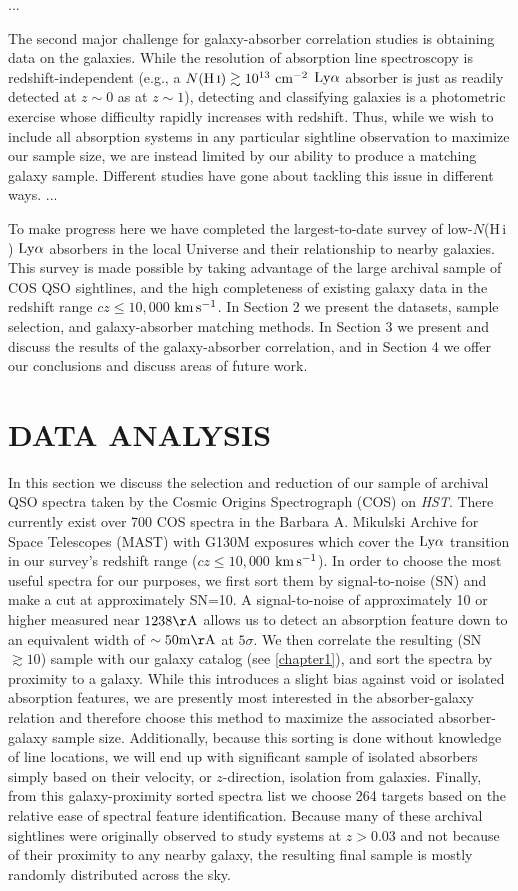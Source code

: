 \documentclass[twocolumn,tighten]{aastex62}
\newcommand{\kms}{$\rm km\, s^{-1}$}
\newcommand{\HI}{\mbox{H\,{\sc i}} }
\begin{document}
...


The second major challenge for galaxy-absorber correlation studies is obtaining data on the galaxies. While the resolution of absorption line spectroscopy is redshift-independent (e.g., a $N(\HI) \gtrsim 10^{13}  ~\rm cm^{-2}$ $\rm Ly\alpha$ absorber is just as readily detected at $z\sim0$ as at $z\sim 1$), detecting and classifying galaxies is a photometric exercise whose difficulty rapidly increases with redshift. Thus, while we wish to include all absorption systems in any particular sightline observation to maximize our sample size, we are instead limited by our ability to produce a matching galaxy sample. Different studies have gone about tackling this issue in different ways. ...


To make progress here we have completed the largest-to-date survey of low-$N$(\HI) $\rm Ly\alpha$ absorbers in the local Universe and their relationship to nearby galaxies. This survey is made possible by taking advantage of the large archival sample of COS QSO sightlines, and the high completeness of existing galaxy data in the redshift range $cz \leq 10,000$ \kms. In Section 2 we present the datasets, sample selection, and galaxy-absorber matching methods. In Section 3 we present and discuss the results of the galaxy-absorber correlation, and in Section 4 we offer our conclusions and discuss areas of future work.



\section{DATA ANALYSIS}
In this section we discuss the selection and reduction of our sample of archival QSO spectra taken by the Cosmic Origins Spectrograph (COS) on \textit{HST}. There currently exist over 700 COS spectra in the Barbara A. Mikulski Archive for Space Telescopes (MAST) with G130M exposures which cover the $\rm Ly\alpha$ transition in our survey's redshift range ($cz \leq 10,000$ \kms). In order to choose the most useful spectra for our purposes, we first sort them by signal-to-noise (SN) and make a cut at approximately SN=10. A signal-to-noise of approximately 10 or higher measured near $\rm 1238 \AA$ allows us to detect an absorption feature down to an equivalent width of $\rm \sim 50 m\AA$ at $5\sigma$. We then correlate the resulting (SN$\gtrsim 10$) sample with our galaxy catalog (see \ref{chapter1}), and sort the spectra by proximity to a galaxy. While this introduces a slight bias against void or isolated absorption features, we are presently most interested in the absorber-galaxy relation and therefore choose this method to maximize the associated absorber-galaxy sample size. Additionally, because this sorting is done without knowledge of line locations, we will end up with significant sample of isolated absorbers simply based on their velocity, or $z$-direction, isolation from galaxies. Finally, from this galaxy-proximity sorted spectra list we choose 264 targets based on the relative ease of spectral feature identification. Because many of these archival sightlines were originally observed to study systems at $z > 0.03$ and not because of their proximity to any nearby galaxy, the resulting final sample is mostly randomly distributed across the sky.
\end{document}
